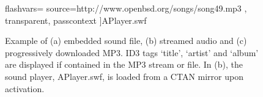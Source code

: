 \documentclass[a4paper]{article}
\begin{document}
\begin{figure}[bp]
{  flashvars={
    source=http://www.openbsd.org/songs/song49.mp3
  },
  transparent,
  passcontext    %
]{\color{blue}}{APlayer.swf}\hfill}\\
\caption{Example of (a) embedded sound file, (b) streamed audio and (c) progressively downloaded MP3. ID3 tags `title', `artist' and `album' are displayed if contained in the MP3 stream or file. In (b), the sound player, APlayer.swf, is loaded from a CTAN mirror upon activation.}\label{radio}
\end{figure}
\end{document}
